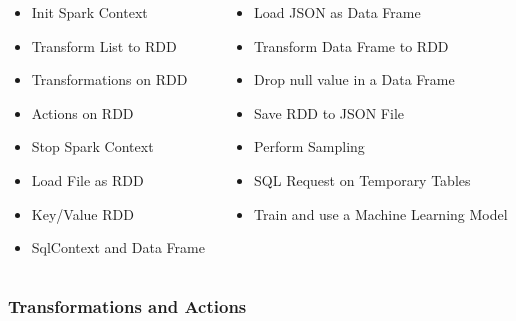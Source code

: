 \documentclass[slidetop,9pt,utf8]{beamer}
\begin{document}
\begin{CJK}{UTF8}{gbsn}
\begin{frame}
  \Large
  \begin{columns}[T] %
    \begin{column}{.48\textwidth}
      \begin{itemize}
        \item Init Spark Context
        \item Transform List to RDD
        \item Transformations on RDD
        \item Actions on RDD
        \item Stop Spark Context
        \item Load File as RDD
        \item Key/Value RDD
        \item SqlContext and Data Frame
      \end{itemize}
    \end{column}%

    \hfill%
    \begin{column}{.48\textwidth}
      \begin{itemize}
        \item Load JSON as Data Frame
        \item Transform Data Frame to RDD
        \item Drop null value in a Data Frame
        \item Save RDD to JSON File
        \item Perform Sampling
        \item SQL Request on Temporary Tables
        \item Train and use a Machine Learning Model
      \end{itemize}
    \end{column}%
  \end{columns}
  \normalsize
\end{frame}

\begin{frame}

  \frametitle{Transformations and Actions}
  

\end{frame}
\end{CJK}
\end{document}
